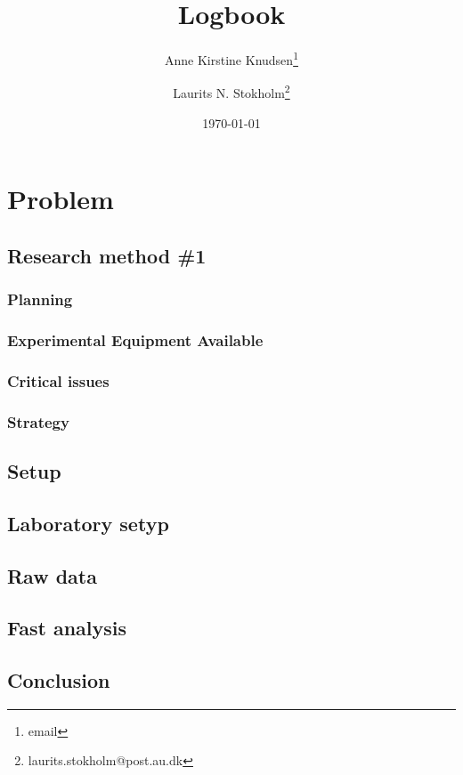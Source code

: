 \documentclass[a4paper, oneside, onecolumn, 11pt]{memoir}
\title{Logbook}
\author{Anne Kirstine Knudsen\thanks{email} \and Laurits N. Stokholm\thanks{laurits.stokholm@post.au.dk}}
\date{\today}
\begin{document}
\maketitle
\section{Problem}


\subsection{Research method \#1}
\subsubsection{Planning}

\subsubsection{Experimental Equipment Available}

\subsubsection{Critical issues}

\subsubsection{Strategy}

\subsection{Setup}

\subsection{Laboratory setyp}

\subsection{Raw data}

\subsection{Fast analysis}

\subsection{Conclusion}
\end{document}
